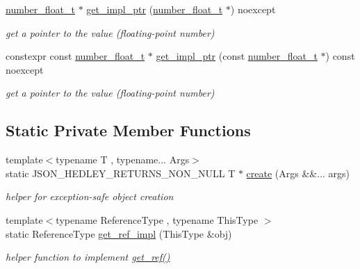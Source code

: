 \begin{DoxyCompactItemize}
\mbox{\label{classnlohmann_1_1basic__json_a01e81365c2c6897b39b793530e02aca5}} 
\mbox{\hyperlink{classnlohmann_1_1basic__json_a88d6103cb3620410b35200ee8e313d97}{number\+\_\+float\+\_\+t}} $\ast$ \mbox{\hyperlink{classnlohmann_1_1basic__json_a01e81365c2c6897b39b793530e02aca5}{get\+\_\+impl\+\_\+ptr}} (\mbox{\hyperlink{classnlohmann_1_1basic__json_a88d6103cb3620410b35200ee8e313d97}{number\+\_\+float\+\_\+t}} $\ast$) noexcept
\begin{DoxyCompactList}\small\item\em get a pointer to the value (floating-\/point number) \end{DoxyCompactList}\item 
\mbox{\label{classnlohmann_1_1basic__json_abbec23daef5fbb5b8bff6a481e5a7160}} 
constexpr const \mbox{\hyperlink{classnlohmann_1_1basic__json_a88d6103cb3620410b35200ee8e313d97}{number\+\_\+float\+\_\+t}} $\ast$ \mbox{\hyperlink{classnlohmann_1_1basic__json_abbec23daef5fbb5b8bff6a481e5a7160}{get\+\_\+impl\+\_\+ptr}} (const \mbox{\hyperlink{classnlohmann_1_1basic__json_a88d6103cb3620410b35200ee8e313d97}{number\+\_\+float\+\_\+t}} $\ast$) const noexcept
\begin{DoxyCompactList}\small\item\em get a pointer to the value (floating-\/point number) \end{DoxyCompactList}\end{DoxyCompactItemize}
\subsection*{Static Private Member Functions}
\begin{DoxyCompactItemize}
\item 
\mbox{\label{classnlohmann_1_1basic__json_a7b3ddcc9fb62cc378b0d431c430b91af}} 
{\footnotesize template$<$typename T , typename... Args$>$ }\\static J\+S\+O\+N\+\_\+\+H\+E\+D\+L\+E\+Y\+\_\+\+R\+E\+T\+U\+R\+N\+S\+\_\+\+N\+O\+N\+\_\+\+N\+U\+LL T $\ast$ \mbox{\hyperlink{classnlohmann_1_1basic__json_a7b3ddcc9fb62cc378b0d431c430b91af}{create}} (Args \&\&... args)
\begin{DoxyCompactList}\small\item\em helper for exception-\/safe object creation \end{DoxyCompactList}\item 
{\footnotesize template$<$typename Reference\+Type , typename This\+Type $>$ }\\static Reference\+Type \mbox{\hyperlink{classnlohmann_1_1basic__json_a040a5feb1eb48da9134924217b25bcf6}{get\+\_\+ref\+\_\+impl}} (This\+Type \&obj)
\begin{DoxyCompactList}\small\item\em helper function to implement \mbox{\hyperlink{classnlohmann_1_1basic__json_afbd800010b67619463c0fce6e74f7878}{get\+\_\+ref()}} \end{DoxyCompactList}\end{DoxyCompactItemize}
